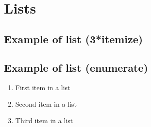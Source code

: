 \documentclass[paper=a4, fontsize=11pt]{scrartcl} %
\begin{document}



\section{Lists}


\subsection{Example of list (3*itemize)}


\subsection{Example of list (enumerate)}
\begin{enumerate}
\item First item in a list 
\item Second item in a list 
\item Third item in a list
\end{enumerate}

\end{document}
